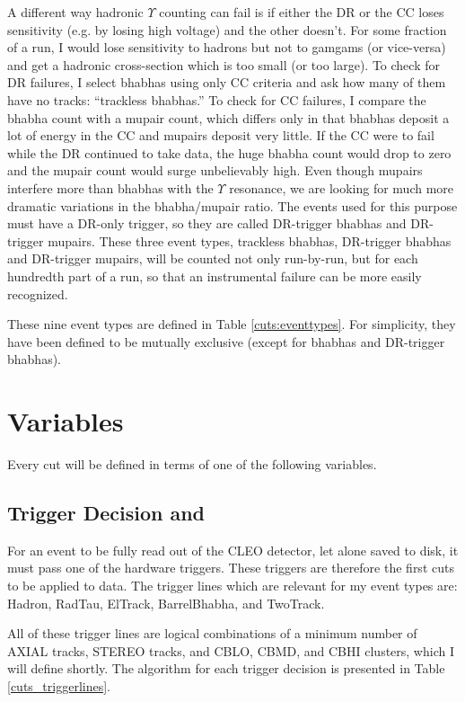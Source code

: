 A different way hadronic $\Upsilon$ counting can fail is if either the
DR or the CC loses sensitivity (e.g. by losing high voltage) and the
other doesn't.  For some fraction of a run, I would lose sensitivity
to hadrons but not to gamgams (or vice-versa) and get a hadronic
cross-section which is too small (or too large).  To check for DR
failures, I select bhabhas using only CC criteria and ask how many of
them have no tracks: ``trackless bhabhas.''  To check for CC failures,
I compare the bhabha count with a mupair count, which differs only in
that bhabhas deposit a lot of energy in the CC and mupairs deposit
very little.  If the CC were to fail while the DR continued to take
data, the huge bhabha count would drop to zero and the mupair count
would surge unbelievably high.  Even though mupairs interfere more
than bhabhas with the $\Upsilon$ resonance, we are looking for much
more dramatic variations in the bhabha/mupair ratio.  The events used
for this purpose must have a DR-only trigger, so they are called
DR-trigger bhabhas and DR-trigger mupairs.  These three event types,
trackless bhabhas, DR-trigger bhabhas and DR-trigger mupairs, will be
counted not only run-by-run, but for each hundredth part of a run, so
that an instrumental failure can be more easily recognized.

These nine event types are defined in Table \ref{cuts:eventtypes}.
For simplicity, they have been defined to be mutually exclusive
(except for bhabhas and DR-trigger bhabhas).

\section{Variables}

Every cut will be defined in terms of one of the following variables.

\subsection{Trigger Decision and \lfourdec}

For an event to be fully read out of the CLEO detector, let alone
saved to disk, it must pass one of the hardware triggers.  These
triggers are therefore the first cuts to be applied to data.  The
trigger lines which are relevant for my event types are: Hadron,
RadTau, ElTrack, BarrelBhabha, and TwoTrack.

All of these trigger lines are logical combinations of a minimum
number of AXIAL tracks, STEREO tracks, and CBLO, CBMD, and CBHI
clusters, which I will define shortly.  The algorithm for each trigger
decision is presented in Table \ref{cuts_triggerlines}.

